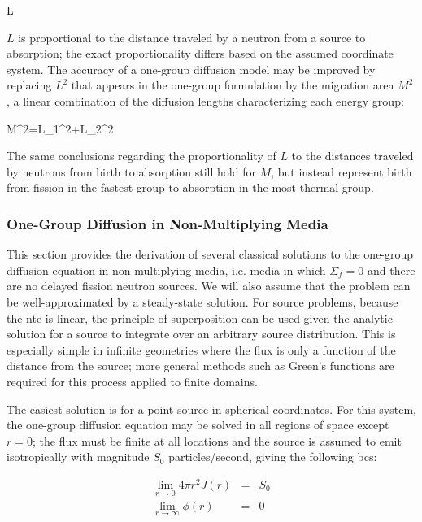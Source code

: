 \beq
\label{eq:DiffusionLength}
L\equiv{}
\eeq

\(L\) is proportional to the distance traveled by a neutron from a source to absorption; the exact proportionality differs based on the assumed coordinate system. The accuracy of a one-group diffusion model may be improved by replacing \(L^2\) that appears in the one-group formulation by the migration area \(M^2\), a linear combination of the diffusion lengths characterizing each energy group:

\beq
M^2=L_1^2+L_2^2
\eeq

The same conclusions regarding the proportionality of \(L\) to the distances traveled by neutrons from birth to absorption still hold for \(M\), but instead represent birth from fission in the fastest group to absorption in the most thermal group.

\subsubsection{One-Group Diffusion in Non-Multiplying Media}
\label{sec:NonMultiplyingDiffusion}
This section provides the derivation of several classical solutions to the one-group diffusion equation in non-multiplying media, i.e. media in which \(\Sigma_f=0\) and there are no delayed fission neutron sources. We will also assume that the problem can be well-approximated by a steady-state solution. For source problems, because the \gls{nte} is linear, the principle of superposition can be used given the analytic solution for a source to integrate over an arbitrary source distribution. This is especially simple in infinite geometries where the flux is only a function of the distance from the source; more general methods such as Green's functions are required for this process applied to finite domains.

\label{sec:1GDEPtSrcSpherical}
The easiest solution is for a point source in spherical coordinates. For this system, the one-group diffusion equation may be solved in all regions of space except \(r=0\); the flux must be finite at all locations and the source is assumed to emit isotropically with magnitude \(S_0\) particles/second, giving the following \glspl{bc}:

\begin{subequations}
\label{eq:1GDESphericalBCs}
\begin{eqnarray}
\lim_{r\rightarrow 0}4\pi r^2J(r)&=&S_0\\
\lim_{r\rightarrow\infty}\phi(r)&=&0
\end{eqnarray}
\end{subequations}

